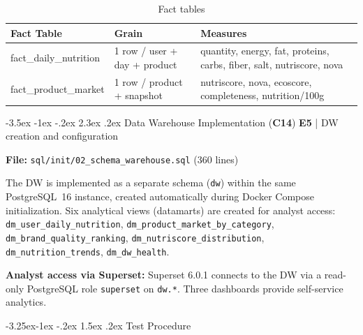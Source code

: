 \documentclass[a4paper,11pt,oneside,openany]{report}
\makeatletter
\renewcommand\section{\@startsection{section}{1}{\z@}%
  {-3.5ex \@plus -1ex \@minus -.2ex}%
  {2.3ex \@plus.2ex}%
  {\normalfont\Large\bfseries\color{ntgreen}}}
\renewcommand\subsection{\@startsection{subsection}{2}{\z@}%
  {-3.25ex\@plus -1ex \@minus -.2ex}%
  {1.5ex \@plus .2ex}%
  {\normalfont\large\bfseries\color{ntdarkgreen}}}
\newcommand{\competence}[1]{\textbf{\textcolor{ntgreen}{#1}}}
\newcommand{\evaluation}[1]{\textbf{\textcolor{ntblue}{#1}}}
\makeatother
\begin{document}
\begin{table}[H]
\centering
\caption{Fact tables}
\label{tab:facts}
\begin{tabularx}{\textwidth}{L{3.5cm} L{4cm} L{5.5cm}}
\toprule
\textbf{Fact Table} & \textbf{Grain} & \textbf{Measures} \\
\midrule
fact\_daily\_nutrition & 1 row / user + day + product & quantity, energy, fat, proteins, carbs, fiber, salt, nutriscore, nova \\
fact\_product\_market & 1 row / product + snapshot & nutriscore, nova, ecoscore, completeness, nutrition/100g \\
\bottomrule
\end{tabularx}
\end{table}


\section{Data Warehouse Implementation (\competence{C14})}
\label{sec:c14}
{\small\evaluation{E5} | DW creation and configuration}

\textbf{File:} \texttt{sql/init/02\_schema\_warehouse.sql} (360 lines)

The DW is implemented as a separate schema (\texttt{dw}) within the same
PostgreSQL~16 instance, created automatically during Docker Compose
initialization. Six analytical views (datamarts) are created for analyst
access: \texttt{dm\_user\_daily\_nutrition},
\texttt{dm\_product\_market\_by\_category},
\texttt{dm\_brand\_quality\_ranking},
\texttt{dm\_nutriscore\_distribution},
\texttt{dm\_nutrition\_trends},
\texttt{dm\_dw\_health}.

\textbf{Analyst access via Superset:} Superset 6.0.1 connects to the DW
via a read-only PostgreSQL role \texttt{superset} on \texttt{dw.*}.
Three dashboards provide self-service analytics.

\subsection{Test Procedure}
\end{document}
